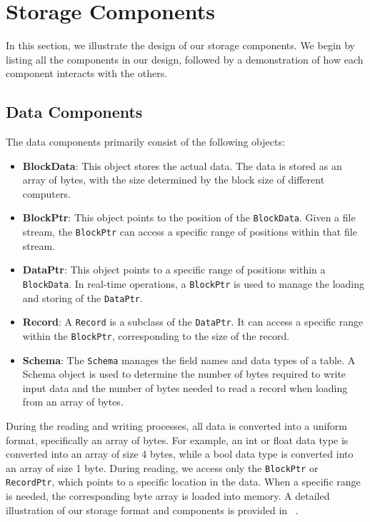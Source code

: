 \section{Storage Components}
\label{sec:storage}

In this section, we illustrate the design of our storage components. We begin by listing all the components in our design, followed by a demonstration of how each component interacts with the others.

\subsection{Data Components}
\label{subsec:data-components}

The data components primarily consist of the following objects:

\begin{itemize}
    \item \textbf{BlockData}: This object stores the actual data. The data is stored as an array of bytes, with the size determined by the block size of different computers.
    \item \textbf{BlockPtr}: This object points to the position of the \texttt{BlockData}. Given a file stream, the \texttt{BlockPtr} can access a specific range of positions within that file stream.
    \item \textbf{DataPtr}: This object points to a specific range of positions within a \texttt{BlockData}. In real-time operations, a \texttt{BlockPtr} is used to manage the loading and storing of the \texttt{DataPtr}.
    \item \textbf{Record}: A \texttt{Record} is a subclass of the \texttt{DataPtr}. It can access a specific range within the \texttt{BlockPtr}, corresponding to the size of the record.
    \item \textbf{Schema}: The \texttt{Schema} manages the field names and data types of a table. A Schema object is used to determine the number of bytes required to write input data and the number of bytes needed to read a record when loading from an array of bytes.
\end{itemize}

During the reading and writing processes, all data is converted into a uniform format, specifically an array of bytes. For example, an int or float data type is converted into an array of size 4 bytes, while a bool data type is converted into an array of size 1 byte. During reading, we access only the \texttt{BlockPtr} or \texttt{RecordPtr}, which points to a specific location in the data. When a specific range is needed, the corresponding byte array is loaded into memory. A detailed illustration of our storage format and components is provided in ~.

